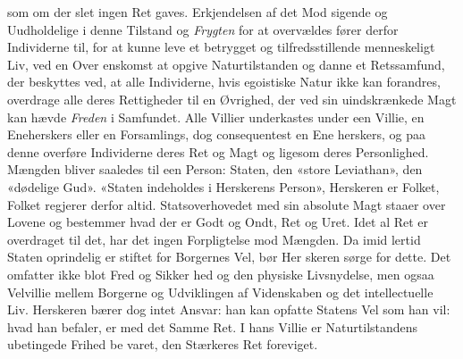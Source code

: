 \documentclass[12pt,a4paper]{book}
\begin{document}
som om der slet ingen Ret gaves. Erkjendelsen af det Mod\-%
sigende og Uudholdelige i denne Tilstand og \emph{Frygten} for
at overvældes fører derfor Individerne til, for at kunne leve et
betrygget og tilfredsstillende menneskeligt Liv, ved en Over\-%
enskomst at opgive Naturtilstanden og danne et Retssamfund,
der beskyttes ved, at alle Individerne, hvis egoistiske Natur
ikke kan forandres, overdrage alle deres Rettigheder til en
Øvrighed, der ved sin uindskrænkede Magt kan hævde \emph{Freden}
i Samfundet. Alle Villier underkastes under een Villie, en
Eneherskers eller en Forsamlings, dog consequentest en Ene\-%
herskers, og paa denne overføre Individerne deres Ret og
Magt og ligesom deres Personlighed. Mængden bliver saaledes
til een Person: Staten, den «store Leviathan», den «dødelige
Gud». «Staten indeholdes i Herskerens Person», Herskeren
er Folket, Folket regjerer derfor altid. Statsoverhovedet med
sin absolute Magt staaer over Lovene og bestemmer hvad der
er Godt og Ondt, Ret og Uret. Idet al Ret er overdraget til
det, har det ingen Forpligtelse mod Mængden. Da imid\-%
lertid Staten oprindelig er stiftet for Borgernes Vel, bør Her\-%
skeren sørge for dette. Det omfatter ikke blot Fred og Sikker\-%
hed og den physiske Livsnydelse, men ogsaa Velvillie mellem
Borgerne og Udviklingen af Videnskaben og det intellectuelle
Liv. Herskeren bærer dog intet Ansvar: han kan opfatte
Statens Vel som han vil: hvad han befaler, er med det Samme
Ret. I hans Villie er Naturtilstandens ubetingede Frihed be\-%
varet, den Stærkeres Ret foreviget.
\end{document}
